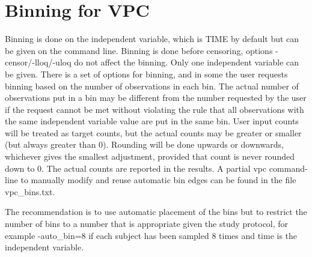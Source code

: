 \section{Binning for VPC}
Binning is done on the independent variable, which is TIME by default but can be given on the command line. Binning is done before censoring, options -censor/-lloq/-uloq do not affect the binning. Only one independent variable can be given. There is a set of options for binning, and in some the user requests binning based on the number of observations in each bin. The actual number of observations put in a bin may be different from the number requested by the user if the request cannot be met without violating the rule that all observations with the same independent variable value are put in the same bin. User input counts will be treated as target counts, but the actual counts may be greater or smaller (but always greater than 0). Rounding will be done upwards or downwards, whichever gives the smallest adjustment, provided that count is never rounded down to 0. The actual counts are reported in the results. A partial vpc command-line to manually modify and reuse automatic bin edges can be found in the file vpc\_bins.txt.

The recommendation is to use automatic placement of the bins but to restrict the number of bins to a number that is appropriate given the study protocol, for example -auto\_bin=8 if each subject has been sampled 8 times and time is the independent variable.

